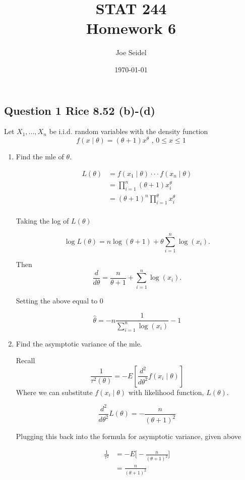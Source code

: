 \documentclass{tufte-book}
\title{STAT 244 \\ Homework 6}
\author{Joe Seidel}
\date{\today}
\theoremstyle{mytheoremstyle}
\theoremstyle{mylemstyle}
\theoremstyle{mydefstyle}
\begin{document}
\maketitle
{}
\newpage
{}

\subsection{Question 1 Rice 8.52 (b)-(d)}
Let $X_1,...,X_n$ be i.i.d. random variables with the density function
\[ f(x\mid \theta) = (\theta + 1)x^\theta \text{ , } 0\leq x \leq 1 \]

\begin{enumerate}

\item Find the mle of $\theta$.

\begin{align*}
L(\theta) &= f(x_1 \mid \theta) \cdot \cdot \cdot f(x_n \mid \theta)\\
&= \prod_{i=1}^n (\theta + 1)x_i^\theta\\
&= (\theta+1)^n \prod_{i=1}^\theta x_i^\theta\\
\end{align*}

Taking the log of $L(\theta)$

\[ \log L(\theta) = n \log(\theta+1) + \theta \sum_{i=1}^n \log(x_i). \]

Then
\[ \frac{d}{d\theta} = \frac{n}{\theta+1} + \sum_{i=1}^n \log(x_i). \]

Setting the above equal to $0$ 

\[ \hat{\theta} = -n \frac{1}{\sum_{i=1}^n \log(x_i)} -1 \]

\item Find the asymptotic variance of the mle.

Recall
\[ \frac{1}{\tau^2(\theta)} = -E[\frac{d^2}{d\theta^2} f(x_i\mid\theta)] \]
Where we can substitute $f(x_i\mid \theta)$ with likelihood function, $L(\theta)$. 

\[ \frac{d^2}{d\theta^2}L(\theta) = -\frac{n}{(\theta +1)^2} \]

Plugging this back into the formula for asymptotic variance, given above

\begin{align*}
\frac{1}{\tau^2} &= -E\Big[-\frac{n}{(\theta +1)^2}\Big]\\
&= \frac{n}{(\theta+1)^2}\\
\end{align*}


\end{enumerate}
\end{document}
